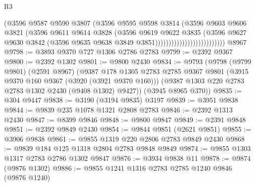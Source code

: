 \begin{lexlean}{R3}
\begin{coremodule}
                                          (@3596
                                            @9587
                                            @9590
                                            @3807
                                            (@3596
                                              @9595
                                              @9598
                                              @3814
                                              (@3596
                                                @9603
                                                @9606
                                                @3821
                                                (@3596
                                                  @9611
                                                  @9614
                                                  @3828
                                                  (@3596
                                                    @9619
                                                    @9622
                                                    @3835
                                                    (@3596
                                                      @9627
                                                      @9630
                                                      @3842
                                                      (@3596
                                                        @9635
                                                        @9638
                                                        @3849
                                                        @3851))))))))))))))))))))))))))
    @8967
@9798 := @3893 @9370 @727 @1306 @2786 @2783
@9799 := @2392 @9367
@9800 := @2392 @1302
@9801 := @9800 @2430
@9834 := @9793
    (@9798
      (@9799 @9801)
      (@2591 @8967)
      (@9387
        @178
        @1305
        @2783
        @2785
        @9367
        @9801
        (@3915 @9370 @160 @9367 (@3920 (@3921 @9370 @160)))
        (@9387 @1303 @220 @2783 @2783 @1302 @2430 (@9408 @1302) @9427))
      (@3945 @8965 @370))
@9835 := @304 @9447
@9838 := @3190 (@3194 @9835) @3197
@9839 := @3951 @9838
@9844 := @9839 @235 @1078 @1321 @2808 @2783
@9846 := @2392 @1313 @2430
@9847 := @8399 @9846
@9848 := @9800 @9847
@9849 := @2391 @9848
@9851 := @2392 @9849 @2430
@9854 := @9844 @9851 (@2621 @9851)
@9855 := @3906 @9838
@9861 := @9855 @1319 @220 @2806 @2783 @9849 @2430
@9868 := @9839 @184 @125 @1318 @2804 @2783 @9848 @9849
@9874 := @9855 @1303 @1317 @2783 @2786 @1302 @9847
@9876 := @3934 @9838 @11
@9878 := @9874 (@9876 @1302)
@9886 := @9855 @1241 @1316 @2783 @2785 @1240 @9846 (@9876 @1240)

\end{coremodule}
\end{lexlean}

